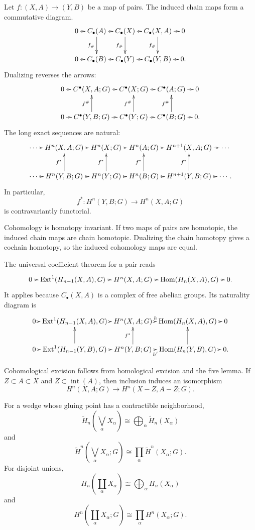 \noindent
Let $f:(X,A)\to(Y,B)$ be a map of pairs.
The induced chain maps form a commutative
diagram.
$$
\xymatrix@C=.65em{
0 \ar[r]
  & C_\bullet(A) \ar[r] \ar[d]_{f_\#}
  & C_\bullet(X) \ar[r] \ar[d]_{f_\#}
  & C_\bullet(X,A) \ar[r]
    \ar[d]_{f_\#}
  & 0 \\
0 \ar[r]
  & C_\bullet(B) \ar[r]
  & C_\bullet(Y) \ar[r]
  & C_\bullet(Y,B) \ar[r]
  & 0.
}
$$
Dualizing reverses the arrows:
$$
\xymatrix@C=.65em{
0 \ar[r]
  & C^\bullet(X,A;G) \ar[r]
  & C^\bullet(X;G) \ar[r]
  & C^\bullet(A;G) \ar[r]
  & 0 \\
0 \ar[r]
  & C^\bullet(Y,B;G)
    \ar[r] \ar[u]^{f^\#}
  & C^\bullet(Y;G)
    \ar[r] \ar[u]^{f^\#}
  & C^\bullet(B;G)
    \ar[r] \ar[u]^{f^\#}
  & 0.
}
$$
The long exact sequences are natural:
$$
\xymatrix@C=.45em{
\cdots \ar[r]
  & H^n(X,A;G) \ar[r]
  & H^n(X;G) \ar[r]
  & H^n(A;G) \ar[r]
  & H^{n+1}(X,A;G) \ar[r]
  & \cdots \\
\cdots \ar[r]
  & H^n(Y,B;G) \ar[r] \ar[u]^{f^*}
  & H^n(Y;G) \ar[r] \ar[u]^{f^*}
  & H^n(B;G) \ar[r] \ar[u]^{f^*}
  & H^{n+1}(Y,B;G)
    \ar[r] \ar[u]^{f^*}
  & \cdots.
}
$$
In particular,
$$
f^*:H^n(Y,B;G)\longrightarrow H^n(X,A;G)
$$
is contravariantly functorial.

\noindent
Cohomology is homotopy invariant.  If two
maps of pairs are homotopic, the induced
chain maps are chain homotopic.  Dualizing
the chain homotopy gives a cochain
homotopy, so the induced cohomology maps
are equal.

\noindent
The universal coefficient theorem for a
pair reads
$$
\xymatrix@C=.55em{
0 \ar[r]
  & \operatorname{Ext}^1
    (H_{n-1}(X,A),G) \ar[r]
  & H^n(X,A;G) \ar[r]
  & \operatorname{Hom}(H_n(X,A),G)
    \ar[r]
  & 0.
}
$$
It applies because $C_\bullet(X,A)$ is a
complex of free abelian groups.  Its
naturality diagram is
$$
\xymatrix@C=.3em@R=2.3em{
0 \ar[r]
  & \operatorname{Ext}^1
    (H_{n-1}(X,A),G) \ar[r]
  & H^n(X,A;G) \ar[r]^-h
  & \operatorname{Hom}(H_n(X,A),G)
    \ar[r]
  & 0 \\
0 \ar[r]
  & \operatorname{Ext}^1
    (H_{n-1}(Y,B),G)
    \ar[r] \ar[u]
  & H^n(Y,B;G)
    \ar[r]_-{h'} \ar[u]^{f^*}
  & \operatorname{Hom}(H_n(Y,B),G)
    \ar[r] \ar[u]
  & 0.
}
$$

\noindent
Cohomological excision follows from
homological excision and the five lemma.
If $Z\subset A\subset X$ and
$\overline Z\subset\operatorname{int}(A)$,
then inclusion induces an isomorphism
$$
H^n(X,A;G)
\longrightarrow
H^n(X-Z,A-Z;G).
$$

\noindent
For a wedge whose gluing point has a
contractible neighborhood,
$$
\widetilde H_n
\left(\bigvee_\alpha X_\alpha\right)
\cong
\bigoplus_\alpha
\widetilde H_n(X_\alpha)
$$
and
$$
\widetilde H^n
\left(\bigvee_\alpha X_\alpha;G\right)
\cong
\prod_\alpha
\widetilde H^n(X_\alpha;G).
$$
For disjoint unions,
$$
H_n\left(\coprod_\alpha X_\alpha\right)
\cong
\bigoplus_\alpha H_n(X_\alpha)
$$
and
$$
H^n
\left(\coprod_\alpha X_\alpha;G\right)
\cong
\prod_\alpha H^n(X_\alpha;G).
$$
